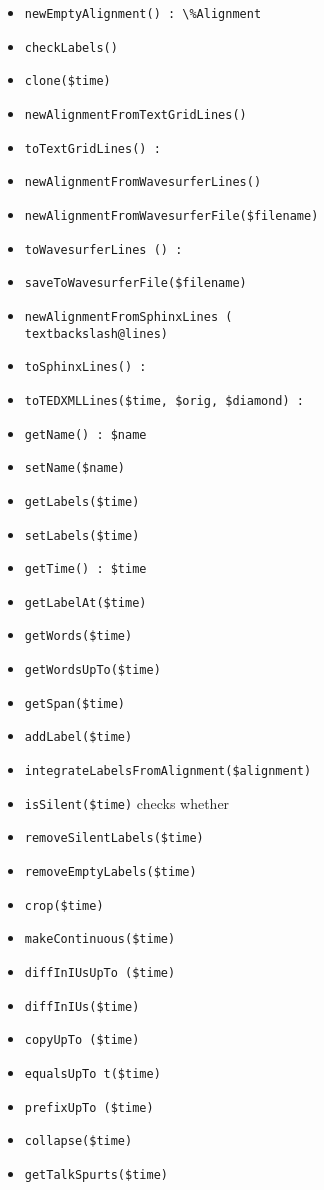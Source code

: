 \documentclass[a4,twoside=off,draft=true]{scrartcl}
\begin{document}
\begin{itemize}
\item {\tt newEmptyAlignment() : \textbackslash{\%Alignment}} 
\item {\tt checkLabels()} 
\item {\tt clone(\$time)} 
\item {\tt newAlignmentFromTextGridLines(\textbackslash@lines)} 
\item {\tt toTextGridLines() : \textbackslash@lines } 
\item {\tt newAlignmentFromWavesurferLines(\textbackslash@lines)} 
\item {\tt newAlignmentFromWavesurferFile(\$filename)} 
\item {\tt toWavesurferLines () : \textbackslash@lines } 
\item {\tt saveToWavesurferFile(\$filename)} 
\item {\tt newAlignmentFromSphinxLines (\\textbackslash@lines)} 
\item {\tt toSphinxLines() : \textbackslash@lines} 
\item {\tt toTEDXMLLines(\$time, \$orig, \$diamond) : \textbackslash@lines } 
\item {\tt getName() : \$name} 
\item {\tt setName(\$name)} 
\item {\tt getLabels(\$time)} 
\item {\tt setLabels(\$time)} 
\item {\tt getTime() : \$time } 
\item {\tt getLabelAt(\$time)}
\item {\tt getWords(\$time)} 
\item {\tt getWordsUpTo(\$time)} 
\item {\tt getSpan(\$time)} 
\item {\tt addLabel(\$time)} 
\item {\tt integrateLabelsFromAlignment(\$alignment)} 
\item {\tt isSilent(\$time)} checks whether 
\item {\tt removeSilentLabels(\$time)} 
\item {\tt removeEmptyLabels(\$time)} 
\item {\tt crop(\$time)} 
\item {\tt makeContinuous(\$time)} 
\item {\tt diffInIUsUpTo (\$time)} 
\item {\tt diffInIUs(\$time)} 
\item {\tt copyUpTo (\$time)} 
\item {\tt equalsUpTo t(\$time)}
\item {\tt prefixUpTo (\$time)} 
\item {\tt collapse(\$time)} 
\item {\tt getTalkSpurts(\$time)} 

\end{itemize}
\end{document}
